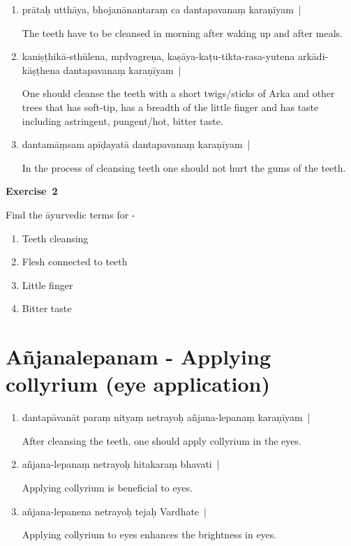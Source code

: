 \begin{enumerate}
\itemsep=0pt
\item {}

prātaḥ utthāya, bhojanānantaraṃ ca dantapavanaṃ karaṇīyam~| 

The teeth have to be cleansed in morning after waking up and after meals.

\item {}

kaniṣṭhikā-sthūlena, mṛdvagreṇa, kaṣāya-kaṭu-tikta-rasa-yutena arkādi-kāṣṭhena dantapavanaṃ karaṇīyam~|  

One should cleanse the teeth with a short twigs/sticks of Arka and other trees that has soft-tip, has a breadth of the little finger and has taste including astringent, pungent/hot, bitter taste.  

\item {}

dantamāṃsam apīḍayatā dantapavanaṃ karaṇīyam~|

In the process of cleansing teeth one should not hurt the gums of the teeth.
\end{enumerate}

\centerline{\textbf{Exercise~2}}

Find the āyurvedic terms for - 
\begin{enumerate}
\itemsep=0pt
\renewcommand{\theenumi}{\alph{enumi}}
\renewcommand{\labelenumi}{\theenumi.}
\item Teeth cleansing
\item Flesh connected to teeth
\item Little finger
\item Bitter taste
\end{enumerate}

\chapter{Añjanalepanam - Applying collyrium (eye application)}

\begin{enumerate}
\itemsep=0pt
\item {}

dantapāvanāt  paraṃ nityaṃ netrayoḥ añjana-lepanaṃ karaṇīyam~| 

After cleansing the teeth, one should apply collyrium in the eyes. 

\item {}

añjana-lepanaṃ netrayoḥ hitakaraṃ  bhavati~| 

Applying collyrium  is beneficial to eyes. 

\item {}

añjana-lepanena netrayoḥ tejaḥ Vardhate~|  

Applying collyrium to eyes enhances the brightness in eyes.
\end{enumerate}



